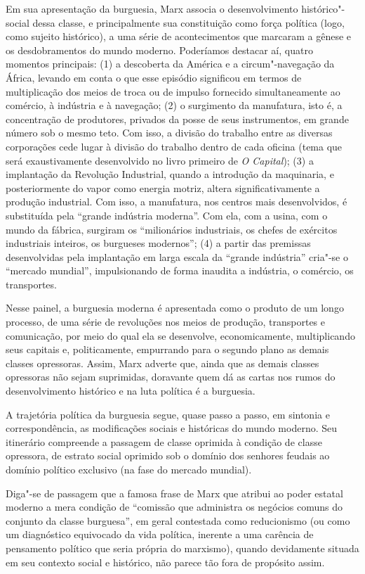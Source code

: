 Em sua apresentação da burguesia, Marx associa o desenvolvimento
histórico"-social dessa classe, e principalmente sua constituição como
força política (logo, como sujeito histórico), a uma série de
acontecimentos que marcaram a gênese e os desdobramentos do mundo
moderno. Poderíamos destacar aí, quatro momentos principais: (1) a
descoberta da América e a circum"-navegação da África, levando em conta o
que esse episódio significou em termos de multiplicação dos meios de
troca ou de impulso fornecido simultaneamente ao comércio, à indústria
e à navegação; (2) o surgimento da manufatura, isto é, a concentração
de produtores, privados da posse de seus instrumentos, em grande número
sob o mesmo teto. Com isso, a divisão do trabalho entre as diversas
corporações cede lugar à divisão do trabalho dentro de cada oficina
(tema que será exaustivamente desenvolvido no livro primeiro de
\textit{O Capital}); (3) a implantação da Revolução Industrial, quando
a introdução da maquinaria, e posteriormente do vapor como energia
motriz, altera significativamente a produção industrial. Com isso, a
manufatura, nos centros mais desenvolvidos, é substituída pela “grande
indústria moderna”. Com ela, com a usina, com o mundo da fábrica,
surgiram os “milionários industriais, os chefes de exércitos
industriais inteiros, os burgueses modernos”; (4) a partir das
premissas desenvolvidas pela implantação em larga escala da “grande
indústria” cria"-se o “mercado mundial”, impulsionando de forma
inaudita a indústria, o comércio, os transportes.

Nesse painel, a burguesia moderna é apresentada como o produto de um
longo processo, de uma série de revoluções nos meios de produção,
transportes e comunicação, por meio do qual ela se desenvolve,
economicamente, multiplicando seus capitais e, politicamente,
empurrando para o segundo plano as demais classes opressoras. Assim,
Marx adverte que, ainda que as demais classes opressoras não sejam
suprimidas, doravante quem dá as cartas nos rumos do desenvolvimento
histórico e na luta política é a burguesia.

A trajetória política da burguesia segue, quase passo a passo, em
sintonia e correspondência, as modificações sociais e históricas do
mundo moderno. Seu itinerário compreende a passagem de classe oprimida
à condição de classe opressora, de estrato social oprimido sob o
domínio dos senhores feudais ao domínio político exclusivo (na fase do
mercado mundial).

Diga"-se de passagem que a famosa frase de Marx que atribui ao poder
estatal moderno a mera condição de “comissão que administra os negócios
comuns do conjunto da classe burguesa”, em geral contestada como
reducionismo (ou como um diagnóstico equivocado da vida política,
inerente a uma carência de pensamento político que seria própria do
marxismo), quando devidamente situada em seu contexto social e
histórico, não parece tão fora de propósito assim.

